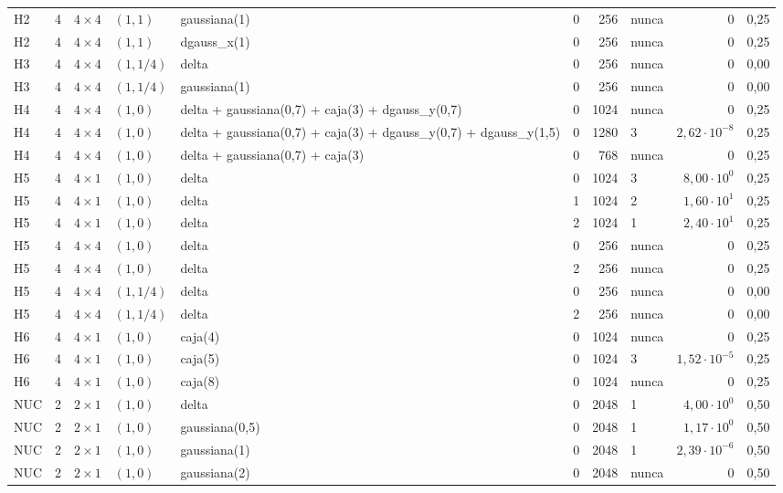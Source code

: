 \begin{tabular}{llllllrlrr}
H2 & 4 & $4\times4$ & $(1, 1)$ & gaussiana(1) & 0 & 256 & nunca & $0$ & 0,25 \\
H2 & 4 & $4\times4$ & $(1, 1)$ & dgauss\_x(1) & 0 & 256 & nunca & $0$ & 0,25 \\
H3 & 4 & $4\times4$ & $(1, 1/4)$ & delta & 0 & 256 & nunca & $0$ & 0,00 \\
H3 & 4 & $4\times4$ & $(1, 1/4)$ & gaussiana(1) & 0 & 256 & nunca & $0$ & 0,00 \\
H4 & 4 & $4\times4$ & $(1, 0)$ & delta + gaussiana(0,7) + caja(3) + dgauss\_y(0,7) & 0 & 1024 & nunca & $0$ & 0,25 \\
H4 & 4 & $4\times4$ & $(1, 0)$ & delta + gaussiana(0,7) + caja(3) + dgauss\_y(0,7) + dgauss\_y(1,5) & 0 & 1280 & 3 & $2{,}62 \cdot 10^{-8}$ & 0,25 \\
H4 & 4 & $4\times4$ & $(1, 0)$ & delta + gaussiana(0,7) + caja(3) & 0 & 768 & nunca & $0$ & 0,25 \\
H5 & 4 & $4\times1$ & $(1, 0)$ & delta & 0 & 1024 & 3 & $8{,}00 \cdot 10^{0}$ & 0,25 \\
H5 & 4 & $4\times1$ & $(1, 0)$ & delta & 1 & 1024 & 2 & $1{,}60 \cdot 10^{1}$ & 0,25 \\
H5 & 4 & $4\times1$ & $(1, 0)$ & delta & 2 & 1024 & 1 & $2{,}40 \cdot 10^{1}$ & 0,25 \\
H5 & 4 & $4\times4$ & $(1, 0)$ & delta & 0 & 256 & nunca & $0$ & 0,25 \\
H5 & 4 & $4\times4$ & $(1, 0)$ & delta & 2 & 256 & nunca & $0$ & 0,25 \\
H5 & 4 & $4\times4$ & $(1, 1/4)$ & delta & 0 & 256 & nunca & $0$ & 0,00 \\
H5 & 4 & $4\times4$ & $(1, 1/4)$ & delta & 2 & 256 & nunca & $0$ & 0,00 \\
H6 & 4 & $4\times1$ & $(1, 0)$ & caja(4) & 0 & 1024 & nunca & $0$ & 0,25 \\
H6 & 4 & $4\times1$ & $(1, 0)$ & caja(5) & 0 & 1024 & 3 & $1{,}52 \cdot 10^{-5}$ & 0,25 \\
H6 & 4 & $4\times1$ & $(1, 0)$ & caja(8) & 0 & 1024 & nunca & $0$ & 0,25 \\
NUC & 2 & $2\times1$ & $(1, 0)$ & delta & 0 & 2048 & 1 & $4{,}00 \cdot 10^{0}$ & 0,50 \\
NUC & 2 & $2\times1$ & $(1, 0)$ & gaussiana(0,5) & 0 & 2048 & 1 & $1{,}17 \cdot 10^{0}$ & 0,50 \\
NUC & 2 & $2\times1$ & $(1, 0)$ & gaussiana(1) & 0 & 2048 & 1 & $2{,}39 \cdot 10^{-6}$ & 0,50 \\
NUC & 2 & $2\times1$ & $(1, 0)$ & gaussiana(2) & 0 & 2048 & nunca & $0$ & 0,50 \\

\end{tabular}
